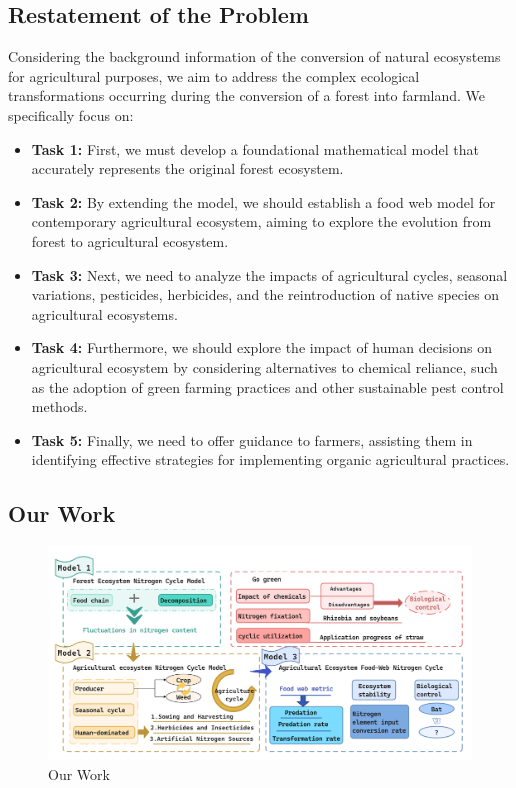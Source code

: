 \documentclass{mcmthesis}
\begin{document}
\subsection{Restatement of the Problem}
Considering the background information of the conversion of natural ecosystems for agricultural purposes, we aim to address the complex ecological transformations occurring during the conversion of a forest into farmland.  We specifically focus on: 
\begin{itemize}
\item {\bf Task 1:} First, we must develop a foundational mathematical model that accurately represents the original forest ecosystem.
\item {\bf Task 2:} By extending the model, we should establish a food web model for contemporary agricultural ecosystem, aiming to explore the evolution from forest to agricultural ecosystem.
\item {\bf Task 3:} Next, we need to analyze the impacts of agricultural cycles, seasonal variations, pesticides, herbicides, and the reintroduction of native species on agricultural ecosystems.
\item {\bf Task 4:} Furthermore, we should explore the impact of human decisions on agricultural ecosystem by considering alternatives to chemical reliance, such as the adoption of green farming practices and other sustainable pest control methods.
\item {\bf Task 5:}  Finally, we need to offer guidance to farmers, assisting them in identifying effective strategies for implementing organic agricultural practices.
\end{itemize}


\subsection{Our Work}

\begin{figure}[h] 
\centering
\includegraphics[width=15cm]{figures/our work.jpg}
\caption{Our Work}

\end{figure}
\end{document}
